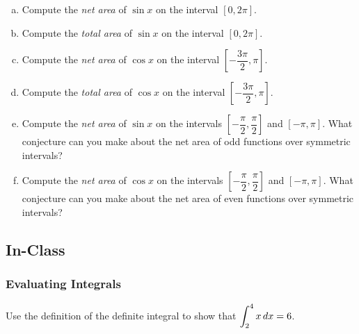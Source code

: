 \documentclass[notes]{subfiles}
\begin{document}
\begin{ex}
\begin{center}
			\end{center}
			\begin{enumerate}[(a)]
				\item Compute the \emph{net area} of $\sin x$ on the interval $[0,2\pi]$.
					
				\item Compute the \emph{total area} of $\sin x$ on the interval $[0,2\pi]$.
					
				\item Compute the \emph{net area} of $\cos x$ on the interval $\left[-\dfrac{3\pi}{2}, \pi\right]$.
					
				\item Compute the \emph{total area} of $\cos x$ on the interval $\left[-\dfrac{3\pi}{2}, \pi\right]$.
					
				\item Compute the \emph{net area} of $\sin x$ on the intervals $\left[-\dfrac{\pi}{2},\dfrac{\pi}{2}\right]$ and $[-\pi,\pi]$.  What conjecture can you make about the net area of odd functions over symmetric intervals?
					
				\item Compute the \emph{net area} of $\cos x$ on the intervals $\left[-\dfrac{\pi}{2},\dfrac{\pi}{2}\right]$ and $[-\pi,\pi]$.  What conjecture can you make about the net area of even functions over symmetric intervals?
			\end{enumerate}
		\end{ex}
			\newpage
			
	\subsection*{In-Class}
	\subsubsection*{Evaluating Integrals}
		\begin{ex}
			Use the definition of the definite integral to show that $\displaystyle \int_2^4 x\, dx = 6$.
		\end{ex}
			
\end{document}
